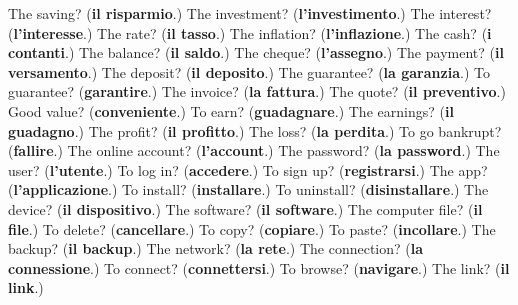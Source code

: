 \begin{tcolorbox}[breakable,colback=teal!4,colframe=teal!35!black,title={Before you move on}]
The saving? (\textbf{il risparmio}.) The investment? (\textbf{l'investimento}.) The interest? (\textbf{l'interesse}.) The rate? (\textbf{il tasso}.) The inflation? (\textbf{l'inflazione}.) The cash? (\textbf{i contanti}.) The balance? (\textbf{il saldo}.) The cheque? (\textbf{l'assegno}.) The payment? (\textbf{il versamento}.) The deposit? (\textbf{il deposito}.) The guarantee? (\textbf{la garanzia}.) To guarantee? (\textbf{garantire}.) The invoice? (\textbf{la fattura}.) The quote? (\textbf{il preventivo}.) Good value? (\textbf{conveniente}.) To earn? (\textbf{guadagnare}.) The earnings? (\textbf{il guadagno}.) The profit? (\textbf{il profitto}.) The loss? (\textbf{la perdita}.) To go bankrupt? (\textbf{fallire}.) The online account? (\textbf{l'account}.) The password? (\textbf{la password}.) The user? (\textbf{l'utente}.) To log in? (\textbf{accedere}.) To sign up? (\textbf{registrarsi}.) The app? (\textbf{l'applicazione}.) To install? (\textbf{installare}.) To uninstall? (\textbf{disinstallare}.) The device? (\textbf{il dispositivo}.) The software? (\textbf{il software}.) The computer file? (\textbf{il file}.) To delete? (\textbf{cancellare}.) To copy? (\textbf{copiare}.) To paste? (\textbf{incollare}.) The backup? (\textbf{il backup}.) The network? (\textbf{la rete}.) The connection? (\textbf{la connessione}.) To connect? (\textbf{connettersi}.) To browse? (\textbf{navigare}.) The link? (\textbf{il link}.)
\end{tcolorbox}

